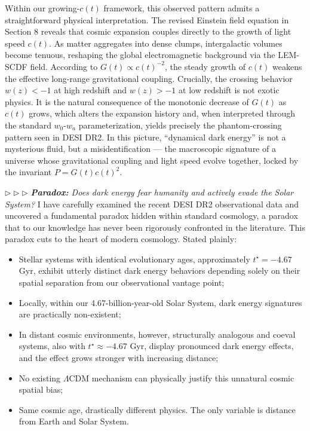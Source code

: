 \documentclass[12pt,leqno]{article}
\begin{document}
{	\medskip
	Within our growing-\(c(t)\) framework, this observed pattern admits a straightforward physical interpretation. The revised Einstein field equation in Section 8 reveals that cosmic expansion couples directly to the growth of light speed \(c(t)\). As matter aggregates into dense clumps, intergalactic volumes become tenuous, reshaping the global electromagnetic background via the LEM-SCDF field. According to \(G(t) \propto c(t)^{-2}\), the steady growth of \(c(t)\) weakens the effective long-range gravitational coupling. Crucially, the crossing behavior \(w(z) < -1\) at high redshift and \(w(z) > -1\) at low redshift is not exotic physics. It is the natural consequence of the monotonic decrease of \(G(t)\) as \(c(t)\) grows, which alters the expansion history and, when interpreted through the standard \(w_0\)-\(w_a\) parameterization, yields precisely the phantom-crossing pattern seen in DESI DR2. In this picture, ``dynamical dark energy'' is not a mysterious fluid, but a misidentification — the macroscopic signature of a universe whose gravitational coupling and light speed evolve together, locked by the invariant \(P = G(t)c(t)^2\).

	
	\bigskip
	\noindent
	$\triangleright \triangleright \triangleright$\enspace
	\textit{\textbf{Paradox:} Does dark energy fear humanity and actively evade the Solar System?} I have carefully examined the recent DESI DR2 observational data and uncovered a fundamental paradox hidden within standard cosmology, a paradox that to our knowledge has never been rigorously confronted in the literature. This paradox cuts to the heart of modern cosmology. Stated plainly:	
	\begin{itemize}
		\item Stellar systems with identical evolutionary ages, approximately $t^\star = -4.67$ Gyr, exhibit utterly distinct dark energy behaviors depending solely on their spatial separation from our observational vantage point;		
		\item Locally, within our 4.67-billion-year-old Solar System, dark energy signatures are practically non-existent;
		\item In distant cosmic environments, however, structurally analogous and coeval systems, also with $t^\star \approx -4.67$ Gyr, display pronounced dark energy effects, and the effect grows stronger with increasing distance;
		\item No existing $\Lambda$CDM mechanism can physically justify this unnatural cosmic spatial bias; 
		\item Same cosmic age, drastically different physics. The only variable is distance from Earth and Solar System.
	\end{itemize}
	
}
\end{document}
